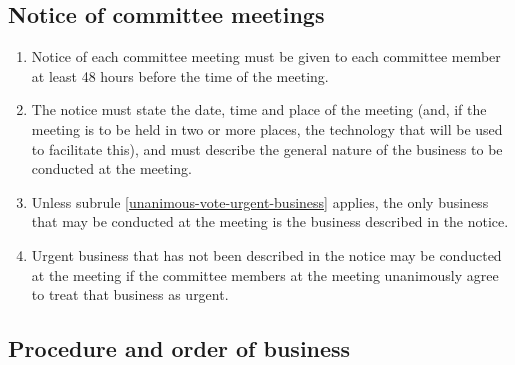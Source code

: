 \documentclass[../constitution.tex]{subfiles}
\begin{document}
\hypertarget{notice-of-committee-meetings}{%
  \subsection{Notice of committee meetings}\label{notice-of-committee-meetings}}

\begin{enumerate}

  \item Notice of each committee meeting must be given to each committee member at least 48 hours before the time of the meeting.
  \item The notice must state the date, time and place of the meeting (and, if the meeting is to be held in two or more places, the technology that will be used to facilitate this), and must describe the general nature of the business to be conducted at the meeting.
  \item Unless subrule \ref{unanimous-vote-urgent-business} applies, the only business that may be conducted at the meeting is the business described in the notice.
  \item Urgent business that has not been described in the notice may be conducted at the meeting if the committee members at the meeting unanimously agree to treat that business as urgent. \label{unanimous-vote-urgent-business}
\end{enumerate}

\hypertarget{procedure-and-order-of-business}{%
  \subsection{Procedure and order of business}\label{procedure-and-order-of-business}}
\end{document}
